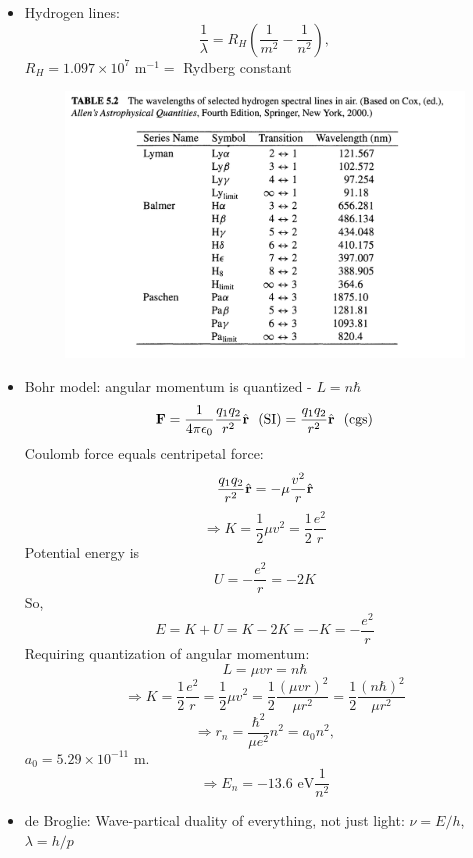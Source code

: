 \documentclass[12pt]{article}
\begin{document}
\begin{itemize}
\item Hydrogen lines:
\begin{equation}
\frac{1}{\lambda} = R_H\left(\frac{1}{m^2} - \frac{1}{n^2}\right),
\end{equation}	
$R_H = 1.097\times 10^7 \text{ m}^{-1} =$ Rydberg constant
\begin{figure}[h!]
\centering
\includegraphics[width=5in]{CandOfigs/hydrogen_lines.png}
\end{figure}
\item Bohr model: angular momentum is quantized - $L = n\hbar$
\begin{equation}
{\bf F} = \frac{1}{4\pi\epsilon_0}\frac{q_1q_2}{r^2}\hat{\bf r}~~(\text{SI}) = \frac{q_1q_2}{r^2}\hat{\bf r}~~(\text{cgs})
\end{equation}
Coulomb force equals centripetal force:
\begin{equation}
\frac{q_1q_2}{r^2}\hat{\bf r} = -\mu \frac{v^2}{r}\hat{\bf r}
\end{equation}
\begin{equation}
\Longrightarrow K = \frac{1}{2}\mu v^2 = \frac{1}{2}\frac{e^2}{r}
\end{equation}
Potential energy is
\begin{equation}
U = -\frac{e^2}{r} = -2K
\end{equation}
So, 
\begin{equation}
E = K+U = K - 2K = -K = -\frac{e^2}{r}
\end{equation}
Requiring quantization of angular momentum:
\begin{equation}
L = \mu v r = n \hbar
\end{equation}
\begin{equation}
\Longrightarrow K = \frac{1}{2}\frac{e^2}{r} = \frac{1}{2}\mu v^2 = \frac{1}{2}\frac{(\mu v r)^2}{\mu r^2} = \frac{1}{2}\frac{(n\hbar)^2}{\mu r^2}
\end{equation}
\begin{equation}
\Longrightarrow r_n = \frac{\hbar^2}{\mu e^2}n^2 = a_0 n^2,
\end{equation}
$a_0 = 5.29\times 10^{-11}\text{ m}$.
\begin{equation}
\Longrightarrow E_n = -13.6\text{ eV}\frac{1}{n^2}
\end{equation}
\item de Broglie: Wave-partical duality of everything, not just light: $\nu = E/h$, $\lambda = h/p$


\end{itemize}
\end{document}
